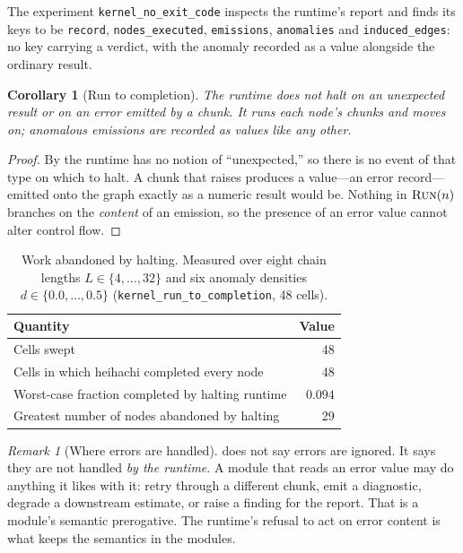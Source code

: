 \documentclass[11pt,twocolumn,a4paper]{article}
\newtheorem{corollary}[theorem]{Corollary}
\theoremstyle{definition}
\theoremstyle{remark}
\newtheorem{remark}[theorem]{Remark}
\newcommand{\node}{n}
\newcommand{\dispatch}{\textsc{Run}}
\begin{document}
The experiment \texttt{kernel\_no\_exit\_code} inspects the runtime's report and
finds its keys to be \texttt{record}, \texttt{nodes\_executed},
\texttt{emissions}, \texttt{anomalies} and \texttt{induced\_edges}: no key
carrying a verdict, with the anomaly recorded as a value alongside the ordinary
result.

\begin{corollary}[Run to completion]
\label{cor:completion}
The runtime does not halt on an unexpected result or on an error emitted by a
chunk. It runs each node's chunks and moves on; anomalous emissions are recorded
as values like any other.
\end{corollary}

\begin{proof}
By  the runtime has no notion of ``unexpected,'' so there is no
event of that type on which to halt. A chunk that raises produces a value---an
error record---emitted onto the graph exactly as a numeric result would be.
Nothing in $\dispatch(\node)$ branches on the \emph{content} of an emission, so
the presence of an error value cannot alter control flow.
\end{proof}

\begin{table}[H]
\centering
\small
\caption{Work abandoned by halting. Measured over eight chain lengths
$L\in\{4,\dots,32\}$ and six anomaly densities $d\in\{0.0,\dots,0.5\}$
(\texttt{kernel\_run\_to\_completion}, 48 cells).}
\label{tab:completion}
\begin{tabular}{@{}lr@{}}
\toprule
Quantity & Value \\
\midrule
Cells swept & 48 \\
Cells in which heihachi completed every node & 48 \\
Worst-case fraction completed by halting runtime & $0.094$ \\
Greatest number of nodes abandoned by halting & 29 \\
\bottomrule
\end{tabular}
\end{table}

\begin{remark}[Where errors are handled]
\label{rem:errors-elsewhere}
 does not say errors are ignored. It says they are not
handled \emph{by the runtime}. A module that reads an error value may do anything
it likes with it: retry through a different chunk, emit a diagnostic, degrade a
downstream estimate, or raise a finding for the report. That is a module's
semantic prerogative. The runtime's refusal to act on error content is what keeps
the semantics in the modules.
\end{remark}
\end{document}
